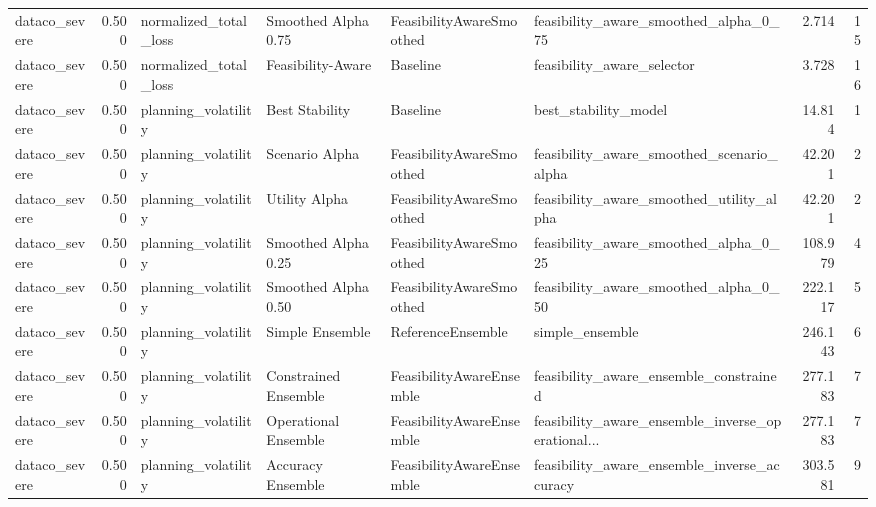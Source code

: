 \begin{table}
{\begin{tabular}{lrllllrr}
 dataco\_severe &             0.500 &       normalized\_total\_loss &   Smoothed Alpha 0.75 &  FeasibilityAwareSmoothed &              feasibility\_aware\_smoothed\_alpha\_0\_75 &         2.714 &              15 \\
 dataco\_severe &             0.500 &       normalized\_total\_loss &     Feasibility-Aware &                  Baseline &                         feasibility\_aware\_selector &         3.728 &              16 \\
 dataco\_severe &             0.500 &         planning\_volatility &        Best Stability &                  Baseline &                               best\_stability\_model &        14.814 &               1 \\
 dataco\_severe &             0.500 &         planning\_volatility &        Scenario Alpha &  FeasibilityAwareSmoothed &          feasibility\_aware\_smoothed\_scenario\_alpha &        42.201 &               2 \\
 dataco\_severe &             0.500 &         planning\_volatility &         Utility Alpha &  FeasibilityAwareSmoothed &           feasibility\_aware\_smoothed\_utility\_alpha &        42.201 &               2 \\
 dataco\_severe &             0.500 &         planning\_volatility &   Smoothed Alpha 0.25 &  FeasibilityAwareSmoothed &              feasibility\_aware\_smoothed\_alpha\_0\_25 &       108.979 &               4 \\
 dataco\_severe &             0.500 &         planning\_volatility &   Smoothed Alpha 0.50 &  FeasibilityAwareSmoothed &              feasibility\_aware\_smoothed\_alpha\_0\_50 &       222.117 &               5 \\
 dataco\_severe &             0.500 &         planning\_volatility &       Simple Ensemble &         ReferenceEnsemble &                                    simple\_ensemble &       246.143 &               6 \\
 dataco\_severe &             0.500 &         planning\_volatility &  Constrained Ensemble &  FeasibilityAwareEnsemble &             feasibility\_aware\_ensemble\_constrained &       277.183 &               7 \\
 dataco\_severe &             0.500 &         planning\_volatility &  Operational Ensemble &  FeasibilityAwareEnsemble &  feasibility\_aware\_ensemble\_inverse\_operational... &       277.183 &               7 \\
 dataco\_severe &             0.500 &         planning\_volatility &     Accuracy Ensemble &  FeasibilityAwareEnsemble &        feasibility\_aware\_ensemble\_inverse\_accuracy &       303.581 &               9 \\

\end{tabular}}
\end{table}

